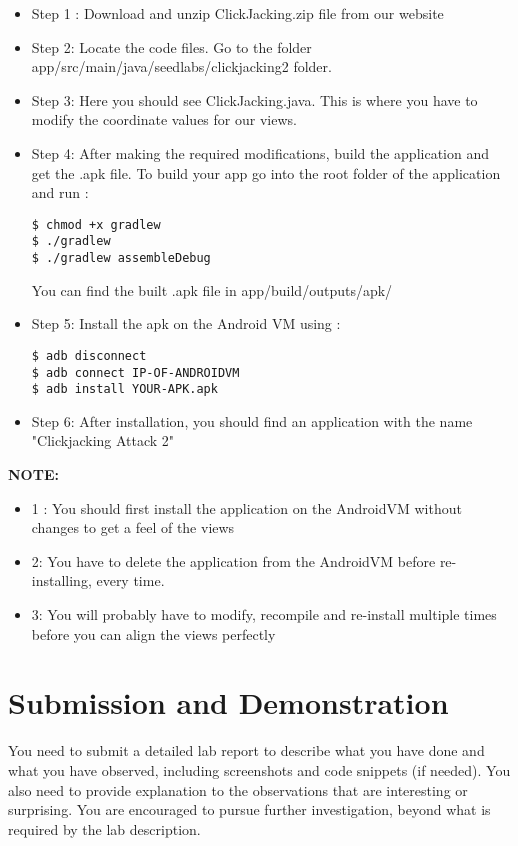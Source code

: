 \begin{itemize}
\item Step 1 : Download and unzip ClickJacking.zip file from our website
\item Step 2: Locate the code files. Go to the folder app/src/main/java/seedlabs/clickjacking2 folder.
\item Step 3: Here you should see ClickJacking.java. This is where you have to modify the coordinate values for our views.
\item Step 4: After making the required modifications, build the
application and get the .apk file. To build your app go into the root
folder of the application and run : 
\begin{lstlisting}
$ chmod +x gradlew
$ ./gradlew
$ ./gradlew assembleDebug
\end{lstlisting}

You can find the built .apk file in app/build/outputs/apk/
\item Step 5: Install the apk on the Android VM using : 

\begin{lstlisting}
$ adb disconnect
$ adb connect IP-OF-ANDROIDVM
$ adb install YOUR-APK.apk
\end{lstlisting}

\item Step 6: After installation, you should find an application with the name "Clickjacking Attack 2" 
\end{itemize}

\textbf{NOTE:} 

\begin{itemize}
\item 1 : You should first install the application on the AndroidVM without
changes to get a feel of the views

\item 2: You have to delete the application from the AndroidVM before re-installing, every time.

\item 3: You will probably have to modify, recompile and re-install multiple times before you can align the views perfectly
\end{itemize}

\section{Submission and Demonstration}

You need to submit a detailed lab report to describe what you have done and what you have
observed, including screenshots and code snippets (if needed). You also need to provide
explanation to the observations that are interesting or surprising. You are encouraged to
pursue further investigation, beyond what is required by the lab description.


